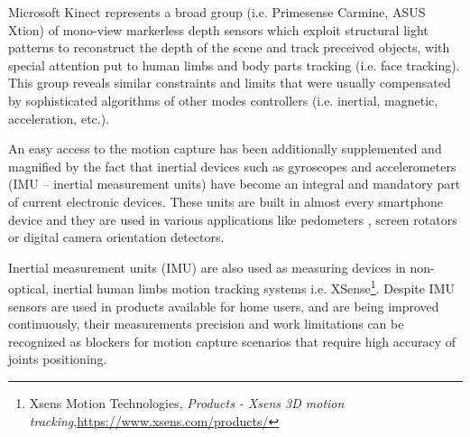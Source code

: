 \documentclass[sensors,article,submit,moreauthors,pdftex,10pt,a4paper]{mdpi}
\begin{document}
Microsoft Kinect represents a broad group (i.e. Primesense Carmine, ASUS Xtion) of mono-view markerless depth sensors which exploit structural light patterns to reconstruct the depth of the scene and track preceived objects, with special attention put to human limbs and body parts tracking (i.e. face tracking). This group reveals similar constraints and limits that were usually compensated by sophisticated algorithms of other modes controllers (i.e. inertial, magnetic, acceleration, etc.)\cite{Helten2013}.

An easy access to the motion capture has been additionally supplemented and magnified by the fact that inertial devices such as gyroscopes and accelerometers (IMU – inertial measurement units) have become an integral and mandatory part of current electronic devices. These units are built in almost every smartphone device and they are used in various applications like pedometers \cite{Huang2012, Jayalath2013}, screen rotators \cite{Pedley2013} or digital camera orientation detectors.

Inertial measurement units (IMU) are also used as measuring devices in non-optical, inertial human limbs motion tracking systems i.e. XSense\footnote{Xsens Motion Technologies, \textit{Products - Xsens 3D motion tracking},\url{https://www.xsens.com/products/}}. Despite IMU sensors are used in products available for home users, and are being improved continuously, their measurements precision and work limitations can be recognized as blockers for motion capture scenarios that require high accuracy of joints positioning.\\%
\end{document}
